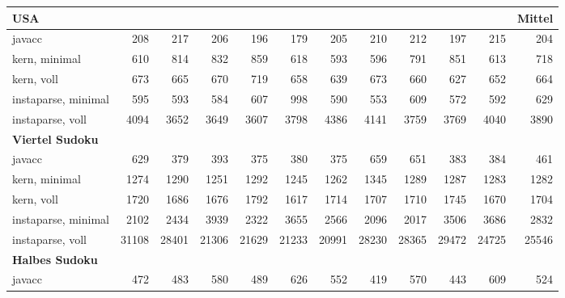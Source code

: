 \documentclass[ngerman,a4paper,abstracton,open=right,twoside=false,toc=listofnumbered,bibtotocnumbered]{scrreprt}
\begin{document}
\begin{table}[!h]
{{\begin{tabular}{|l|r|r|r|r|r|r|r|r|r|r|r|}
				\textbf{USA} & \multicolumn{1}{l|}{\textbf{}} & \multicolumn{1}{l|}{\textbf{}} & \multicolumn{1}{l|}{\textbf{}} & \multicolumn{1}{l|}{\textbf{}} & \multicolumn{1}{l|}{\textbf{}} & \multicolumn{1}{l|}{\textbf{}} & \multicolumn{1}{l|}{\textbf{}} & \multicolumn{1}{l|}{\textbf{}} & \multicolumn{1}{l|}{\textbf{}} & \multicolumn{1}{l|}{\textbf{}} & \textbf{Mittel} \\ \hline
				javacc  & 208 & 217 & 206 & 196 & 179 & 205 & 210 & 212 & 197 & 215 & 204 \\ \hline
				kern, minimal   & 610 & 814 & 832 & 859 & 618 & 593 & 596 & 791 & 851 & 613 & 718 \\ \hline
				kern, voll   & 673 & 665 & 670 & 719 & 658 & 639 & 673 & 660 & 627 & 652 & 664 \\ \hline
				instaparse, minimal   & 595 & 593 & 584 & 607 & 998 & 590 & 553 & 609 & 572 & 592 & 629 \\ \hline
				instaparse, voll   & 4094 & 3652 & 3649 & 3607 & 3798 & 4386 & 4141 & 3759 & 3769 & 4040 & 3890 \\ \hline
				\textbf{Viertel Sudoku} & \multicolumn{1}{l|}{} & \multicolumn{1}{l|}{} & \multicolumn{1}{l|}{} & \multicolumn{1}{l|}{} & \multicolumn{1}{l|}{} & \multicolumn{1}{l|}{} & \multicolumn{1}{l|}{} & \multicolumn{1}{l|}{} & \multicolumn{1}{l|}{} & \multicolumn{1}{l|}{} & \multicolumn{1}{l|}{} \\ \hline
				javacc  & 629 & 379 & 393 & 375 & 380 & 375 & 659 & 651 & 383 & 384 & 461 \\ \hline
				kern, minimal   & 1274 & 1290 & 1251 & 1292 & 1245 & 1262 & 1345 & 1289 & 1287 & 1283 & 1282 \\ \hline
				kern, voll   & 1720 & 1686 & 1676 & 1792 & 1617 & 1714 & 1707 & 1710 & 1745 & 1670 & 1704 \\ \hline
				instaparse, minimal   & 2102 & 2434 & 3939 & 2322 & 3655 & 2566 & 2096 & 2017 & 3506 & 3686 & 2832 \\ \hline
				instaparse, voll   & 31108 & 28401 & 21306 & 21629 & 21233 & 20991 & 28230 & 28365 & 29472 & 24725 & 25546 \\ \hline
				\textbf{Halbes Sudoku} & \multicolumn{1}{l|}{} & \multicolumn{1}{l|}{} & \multicolumn{1}{l|}{} & \multicolumn{1}{l|}{} & \multicolumn{1}{l|}{} & \multicolumn{1}{l|}{} & \multicolumn{1}{l|}{} & \multicolumn{1}{l|}{} & \multicolumn{1}{l|}{} & \multicolumn{1}{l|}{} & \multicolumn{1}{l|}{} \\ \hline
				javacc  & 472 & 483 & 580 & 489 & 626 & 552 & 419 & 570 & 443 & 609 & 524 \\ \hline

\end{tabular}}}
\end{table}
\end{document}
